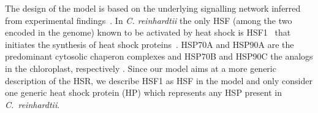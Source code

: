 \documentclass[oneside, 10pt, a4paper, twocolumn]{article}
\begin{document}
The design of the model is based on the underlying signalling network
inferred from experimental findings~\cite{Schmollinger2013}.
In \emph{C. reinhardtii} the only HSF (among the two encoded in the genome) known to be activated 
by heat shock is HSF1~\cite{Schulz-Raffelt2007} that initiates the synthesis of heat shock proteins~\cite{Schroda2004}. HSP70A and HSP90A are the predominant cytosolic chaperon complexes and HSP70B and HSP90C the analogs in the chloroplast, respectively \cite{Wilmund2005}.
Since our model aims at a more generic description of the HSR, we describe HSF1 as  HSF in the model and only consider one generic heat shock protein (HP)
which represents any HSP present in \emph{C.~reinhardtii}. 



\end{document}
